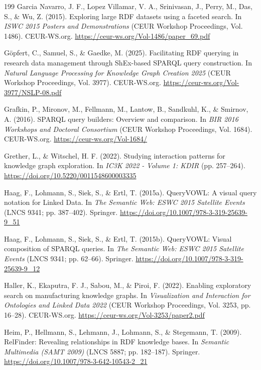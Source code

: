 \documentclass[manuscript,review,screen]{acmart}
\begin{document}
\begin{thebibliography}{199}
 Garcia Navarro, J. F., Lopez Villamar, V. A., Srinivasan, J., Perry, M., Das, S., \& Wu, Z. (2015). Exploring large RDF datasets using a faceted search. In \textit{ISWC 2015 Posters and Demonstrations} (CEUR Workshop Proceedings, Vol. 1486). CEUR-WS.org. \url{https://ceur-ws.org/Vol-1486/paper_69.pdf}

 G\"{o}pfert, C., Samuel, S., \& Gaedke, M. (2025). Facilitating RDF querying in research data management through ShEx-based SPARQL query construction. In \textit{Natural Language Processing for Knowledge Graph Creation 2025} (CEUR Workshop Proceedings, Vol. 3977). CEUR-WS.org. \url{https://ceur-ws.org/Vol-3977/NSLP-08.pdf}

 Grafkin, P., Mironov, M., Fellmann, M., Lantow, B., Sandkuhl, K., \& Smirnov, A. (2016). SPARQL query builders: Overview and comparison. In \textit{BIR 2016 Workshops and Doctoral Consortium} (CEUR Workshop Proceedings, Vol. 1684). CEUR-WS.org. \url{https://ceur-ws.org/Vol-1684/}

 Grether, L., \& Witschel, H. F. (2022). Studying interaction patterns for knowledge graph exploration. In \textit{IC3K 2022 - Volume 1: KDIR} (pp. 257--264). \url{https://doi.org/10.5220/0011548600003335}

 Haag, F., Lohmann, S., Siek, S., \& Ertl, T. (2015a). QueryVOWL: A visual query notation for Linked Data. In \textit{The Semantic Web: ESWC 2015 Satellite Events} (LNCS 9341; pp. 387--402). Springer. \url{https://doi.org/10.1007/978-3-319-25639-9_51}

 Haag, F., Lohmann, S., Siek, S., \& Ertl, T. (2015b). QueryVOWL: Visual composition of SPARQL queries. In \textit{The Semantic Web: ESWC 2015 Satellite Events} (LNCS 9341; pp. 62--66). Springer. \url{https://doi.org/10.1007/978-3-319-25639-9_12}

 Haller, K., Ekaputra, F. J., Sabou, M., \& Piroi, F. (2022). Enabling exploratory search on manufacturing knowledge graphs. In \textit{Visualization and Interaction for Ontologies and Linked Data 2022} (CEUR Workshop Proceedings, Vol. 3253, pp. 16--28). CEUR-WS.org. \url{https://ceur-ws.org/Vol-3253/paper2.pdf}

 Heim, P., Hellmann, S., Lehmann, J., Lohmann, S., \& Stegemann, T. (2009). RelFinder: Revealing relationships in RDF knowledge bases. In \textit{Semantic Multimedia (SAMT 2009)} (LNCS 5887; pp. 182--187). Springer. \url{https://doi.org/10.1007/978-3-642-10543-2_21}


\end{thebibliography}
\end{document}
